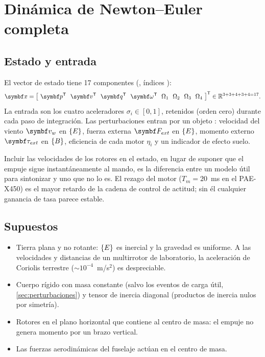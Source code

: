 \section{Dinámica de Newton--Euler completa}
\label{sec:dinamica}

\subsection{Estado y entrada}

El vector de estado tiene 17 componentes (, índices
):
\begin{equation}
\vect x = \big[\ \vect p\T\ \ \vect v\T\ \ \vect q\T\ \ \vect\omega\T\ \ \Omega_1\ \ \Omega_2\ \ \Omega_3\ \ \Omega_4\ \big]\T\in\mathbb R^{3+3+4+3+4=17} .
\label{eq:estado}
\end{equation}
La entrada son los cuatro aceleradores $\sigma_i\in[0,1]$, retenidos
(orden cero) durante cada paso de integración. Las perturbaciones entran por
un objeto : velocidad del viento $\vect v_w$ en $\{E\}$, fuerza
externa $\vect F_{ext}$ en $\{E\}$, momento externo $\vect\tau_{ext}$ en $\{B\}$,
eficiencia de cada motor $\eta_i$ y un indicador de efecto suelo.

Incluir las velocidades de los rotores en el estado, en lugar de suponer que
el empuje sigue instantáneamente al mando, es la diferencia entre un modelo
útil para sintonizar y uno que no lo es. El rezago del motor ($T_m=20$~ms en
el PAE-X450) es el mayor retardo de la cadena de control de actitud; sin él
cualquier ganancia de tasa parece estable.

\subsection{Supuestos}

\begin{supuesto}
\begin{itemize}[leftmargin=1.2em]
\item Tierra plana y no rotante: $\{E\}$ es inercial y la gravedad es uniforme.
A las velocidades y distancias de un multirrotor de laboratorio, la
aceleración de Coriolis terrestre ($\sim10^{-4}$~m/s$^2$) es despreciable.
\item Cuerpo rígido con masa constante (salvo los eventos de carga útil,
\cref{sec:perturbaciones}) y tensor de inercia diagonal (productos de inercia
nulos por simetría).
\item Rotores en el plano horizontal que contiene al centro de masa: el
empuje no genera momento por un brazo vertical.
\item Las fuerzas aerodinámicas del fuselaje actúan en el centro de masa.
\end{itemize}
\end{supuesto}

